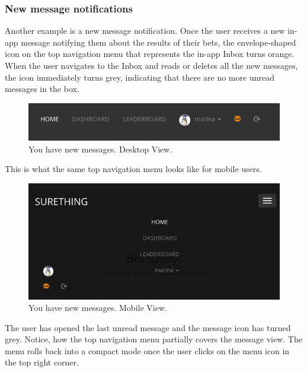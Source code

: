 \subsubsection*{New message notifications}
Another example is a new message notification. Once the user receives a new in-app message notifying them about the results of their bets, the envelope-shaped icon on the top navigation menu that represents the in-app Inbox turns orange. When the user navigates to the Inbox and reads or deletes all the new messages, the icon immediately turns grey, indicating that there are no more unread messages in the box.

\begin{figure}[H]
	\begin{center}
		\includegraphics[width=.60\textwidth]{impl/images/newMessagesDesktopView}
		\caption{You have new messages. Desktop View.} 
		\label{fig:newmessagesdesktopview}
	\end{center}
\end{figure}

This is what the same top navigation menu looks like for mobile users.

\begin{figure}[H]
	\begin{center}
		\includegraphics[width=.60\textwidth]{impl/images/newMessagesMobileView}
		\caption{You have new messages. Mobile View.} 
		\label{fig:newmessagesmobileview}
	\end{center}
\end{figure}

The user has opened the last unread message and the message icon has turned grey. Notice, how the top navigation menu partially covers the message view. The menu rolls back into a compact mode once the user clicks on the menu icon in the top right corner.

